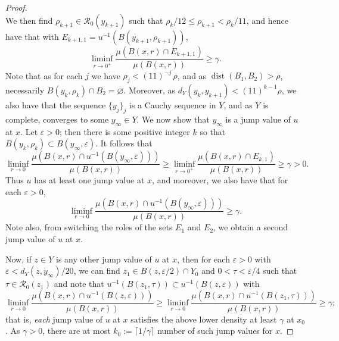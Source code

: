\documentclass[11pt, letterpaper]{amsart} %
\newcommand*{\eps}{\varepsilon}
\DeclareMathOperator{\dist}{dist}
\numberwithin{equation}{section}
\theoremstyle{plain}
\theoremstyle{definition}
\begin{document}
{\begin{proof}
\[\]
We then find $\rho_{k+1}\in\mathcal{R}_0(y_{k+1})$ such that $\rho_k/12\le \rho_{k+1}<\rho_k/11$, 
and hence have that with $E_{k+1,1}=u^{-1}(B(y_{k+1},\rho_{k+1}))$,
\[
\liminf_{r\to 0^+}\frac{\mu(B(x,r)\cap E_{k+1,1})}{\mu(B(x,r))}\ge \gamma.
\]
Note that as for each $j$ we have $\rho_j<(11)^{-j}\, \rho$, and as $\dist(B_1,B_2)>\rho$, necessarily
$B(y_k,\rho_k)\cap B_2=\varnothing$. Moreover, as $d_Y(y_k,y_{k+1})<(11)^{k-1}\rho$, we also have that
the sequence $\{y_j\}_j$ is a Cauchy sequence in $Y$, and as $Y$ is complete, converges to some $y_\infty\in Y$.
We now show that $y_\infty$ is a jump value of $u$ at $x$. Let $\eps>0$; then there is some positive integer $k$
so that $B(y_k,\rho_k)\subset B(y_\infty,\eps)$. It follows that
\[
\liminf_{r\to 0}\frac{\mu(B(x,r)\cap u^{-1}(B(y_\infty,\eps)))}{\mu(B(x,r))}
\ge \liminf_{r\to 0^+}\frac{\mu(B(x,r)\cap E_{k,1})}{\mu(B(x,r))}\ge \gamma>0.
\]
Thus $u$ has at least one jump value at $x$, and moreover, we also have that for each $\eps>0$,
\[
\liminf_{r\to 0}\frac{\mu(B(x,r)\cap u^{-1}(B(y_\infty,\eps)))}{\mu(B(x,r))}
\ge\gamma.
\]
Note also, from switching the roles of the sets $E_1$ and $E_2$, 
we obtain a second jump value of $u$ at $x$.

Now, if $z\in Y$ is any other jump value of $u$ at $x$, then for each $\eps>0$ with $\eps<d_Y(z,y_\infty)/20$,
we can find $z_1\in B(z,\eps/2)\cap Y_0$ and $0<\tau<\eps/4$ such that $\tau\in\mathcal{R}_0(z_1)$
and note that $u^{-1}(B(z_1,\tau))\subset u^{-1}(B(z,\eps))$ 
with
\begin{equation}\label{eq:lower-density-jump}
\liminf_{r\to 0}\frac{\mu(B(x,r)\cap u^{-1}(B(z,\eps)))}{\mu(B(x,r))}
\ge \liminf_{r\to 0}\frac{\mu(B(x,r)\cap u^{-1}(B(z_1,\tau)))}{\mu(B(x,r))}
\ge\gamma;
\end{equation}
that is, \emph{each} jump value of $u$ at $x$ satisfies the above lower density at least $\gamma$ at $x_0$.
As $\gamma>0$, there are at most $k_0:=\lceil 1/\gamma\rceil$ number of such jump values for $x$.


\end{proof}}
\end{document}
